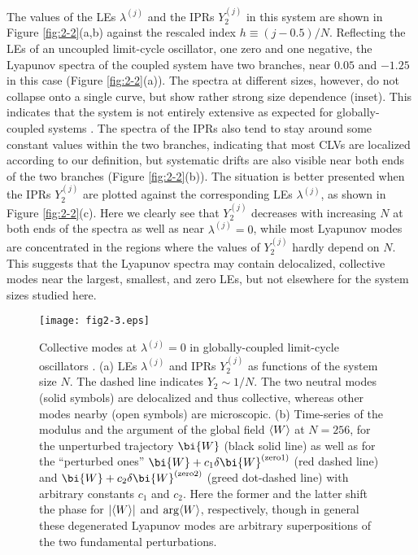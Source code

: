 \documentclass[12pt]{iopart}
\begin{document}
The values of the LEs $\lambda^{(j)}$ and the IPRs $Y_2^{(j)}$
 in this system are shown in Figure \ref{fig:2-2}(a,b)
 against the rescaled index $h \equiv (j-0.5)/N$.
Reflecting the LEs of an uncoupled limit-cycle oscillator,
 one zero and one negative, the Lyapunov spectra of the coupled system
 have two branches, near $0.05$ and $-1.25$ in this case
 (Figure \ref{fig:2-2}(a)).
The spectra at different sizes, however, do not collapse
 onto a single curve, but show rather strong size dependence (inset).
This indicates that the system is not entirely extensive
 as expected for globally-coupled systems \cite{Takeuchi.etal-PRL2011}.
The spectra of the IPRs also tend to stay around some constant values
 within the two branches, indicating that most CLVs are localized
 according to our definition, but systematic drifts are also visible
 near both ends of the two branches (Figure \ref{fig:2-2}(b)).
The situation is better presented when the IPRs $Y_2^{(j)}$
 are plotted against the corresponding LEs $\lambda^{(j)}$,
 as shown in Figure \ref{fig:2-2}(c).
Here we clearly see that $Y_2^{(j)}$ decreases with increasing $N$
 at both ends of the spectra as well as near $\lambda^{(j)}=0$,
 while most Lyapunov modes are concentrated in the regions
 where the values of $Y_2^{(j)}$ hardly depend on $N$.
This suggests that the Lyapunov spectra may contain
 delocalized, collective modes near the largest, smallest, and zero LEs,
 but not elsewhere for the system sizes studied here.

\begin{figure}[t]
 \begin{center}
  \texttt{[image: fig2-3.eps]}
  \caption{Collective modes at $\lambda^{(j)} = 0$ in globally-coupled limit-cycle oscillators . (a) LEs $\lambda^{(j)}$ and IPRs $Y_2^{(j)}$ as functions of the system size $N$. The dashed line indicates $Y_2 \sim 1/N$. The two neutral modes (solid symbols) are delocalized and thus collective, whereas other modes nearby (open symbols) are microscopic. (b) Time-series of the modulus and the argument of the global field $\langle W \rangle$ at $N=256$, for the unperturbed trajectory $\bi{W}$ (black solid line) as well as for the ``perturbed ones'' $\bi{W}+c_1\delta\bi{W}^{\mathrm{(zero1)}}$ (red dashed line) and $\bi{W}+c_2\delta\bi{W}^{\mathrm{(zero2)}}$ (greed dot-dashed line) with arbitrary constants $c_1$ and $c_2$. Here the former and the latter shift the phase for $|\langle W \rangle|$ and $\arg\langle W \rangle$, respectively, though in general these degenerated Lyapunov modes are arbitrary superpositions of the two fundamental perturbations.}
  \label{fig:2-3}
 \end{center}
\end{figure}%
\end{document}
